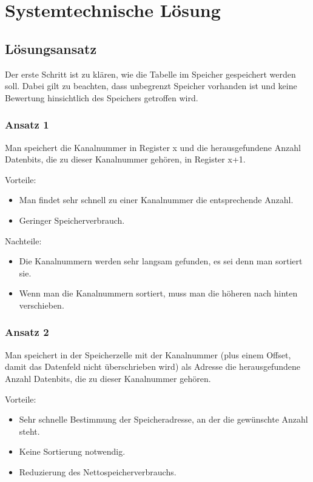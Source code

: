 \chapter{Systemtechnische Lösung}
\label{chapter:Pflichtenheft-SystemtechnischeLoesung}

\section{Lösungsansatz}
\label{section:Pflichtenheft-SystemtechnischeLoesung-Loesungsansatz}

Der erste Schritt ist zu klären, wie die Tabelle im Speicher gespeichert werden soll. Dabei gilt zu beachten, dass unbegrenzt Speicher vorhanden ist und keine Bewertung hinsichtlich des Speichers getroffen wird.

\subsection{Ansatz 1}
Man speichert die Kanalnummer in Register x und die herausgefundene Anzahl Datenbits, die zu dieser Kanalnummer gehören, in Register x+1.

Vorteile:
\begin{itemize}
    \item Man findet sehr schnell zu einer Kanalnummer die entsprechende Anzahl.
    \item Geringer Speicherverbrauch.
\end{itemize}

Nachteile:
\begin{itemize}
    \item Die Kanalnummern werden sehr langsam gefunden, es sei denn man sortiert sie.
    \item Wenn man die Kanalnummern sortiert, muss man die höheren nach hinten verschieben.
\end{itemize}

\subsection{Ansatz 2}
\label{subsection:Pflichtenheft-SystemtechnischeLoesung-Loesungsansatz-Ansatz2}
Man speichert in der Speicherzelle mit der Kanalnummer (plus einem Offset, damit das Datenfeld nicht überschrieben wird) als Adresse die herausgefundene Anzahl Datenbits, die zu dieser Kanalnummer gehören.

Vorteile:
\begin{itemize}
    \item Sehr schnelle Bestimmung der Speicheradresse, an der die gewünschte Anzahl steht.
    \item Keine Sortierung notwendig.
    \item Reduzierung des Nettospeicherverbrauchs.
\end{itemize}

